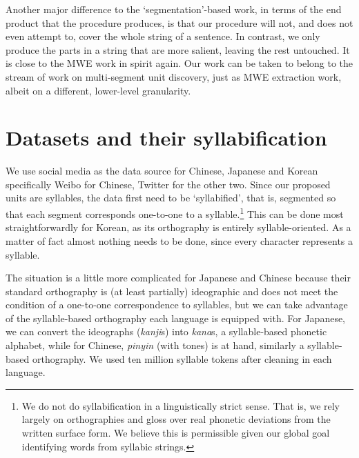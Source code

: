 \documentclass[a4]{article}
\begin{document}
Another major difference to the `segmentation'-based work, in terms of the end product that the procedure produces, is that our procedure will not, and does not even attempt to, cover the whole string of a sentence. In contrast, we only produce the parts in a string that are more salient, leaving the rest untouched. It is close to the MWE work in spirit again. Our work can be taken to belong to the stream of work on multi-segment unit discovery, just as MWE extraction work, albeit on a different, lower-level granularity. %

\section{Datasets and their syllabification}

We use social media as the data source for Chinese, Japanese and Korean specifically Weibo for Chinese, Twitter for the other two. Since our proposed units are syllables, the data first need to be `syllabified', that is, segmented so that each segment corresponds one-to-one to a syllable.\footnote{We do not do syllabification in a linguistically strict sense. That is, we rely largely on orthographies and gloss over real phonetic deviations from the written surface form. We believe this is permissible given our global goal identifying words from syllabic strings. } This can be done most straightforwardly for Korean, as its orthography is entirely syllable-oriented. As a matter of fact almost nothing needs to be done, since every character represents a syllable. 

The situation is a little more complicated for Japanese and Chinese because their standard orthography is (at least partially) ideographic and does not meet the condition of a one-to-one correspondence to syllables, but we can take advantage of the syllable-based orthography each language is equipped with. For Japanese, we can convert the ideographs (\emph{kanji}s) into \emph{kana}s, a syllable-based phonetic alphabet, while for Chinese, \emph{pinyin} (with tones) is at hand, similarly a syllable-based orthography. We used ten million syllable tokens after cleaning in each language. 

\end{document}
